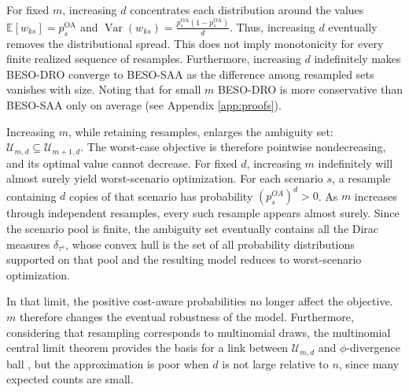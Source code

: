 \documentclass[mnsc,sglanonrev]{informs4}  %
\theoremstyle{remark}\newtheorem{remark}{Remark}
\begin{document}
For fixed $m$, increasing $d$ concentrates each distribution around the values 
$\mathbb E[w_{ks}]=p_s^{\mathrm{OA}}$ and
$\operatorname{Var}(w_{ks}) =\frac{p_s^{\mathrm{OA}}(1-p_s^{\mathrm{OA}})}{d}.$
Thus, increasing $d$ eventually removes the distributional spread. This does not imply monotonicity for every finite realized sequence of resamples. Furthermore, increasing $d$ indefinitely makes BESO-DRO converge to BESO-SAA as the difference among resampled sets vanishes with size. Noting that for small $m$ BESO-DRO is more conservative than BESO-SAA only on average (see Appendix \ref{app:proofs}).

Increasing $m$, while retaining resamples, enlarges the ambiguity set: $\mathcal U_{m,d}\subseteq\mathcal U_{m+1,d}.$
The worst-case objective is therefore pointwise nondecreasing, and its optimal value cannot decrease. 
For fixed $d$, increasing $m$ indefinitely will almost surely yield worst-scenario optimization. For each scenario $s$, a resample containing $d$ copies of that scenario has probability $(p_s^{OA})^d>0$. As $m$ increases through independent resamples, every such resample appears almost surely. Since the scenario pool is finite, the ambiguity set eventually contains all the Dirac measures $\delta_{\tau^s}$, whose convex hull is the set of all probability distributions supported on that pool and the resulting model reduces to worst-scenario optimization.

In that limit, the positive cost-aware probabilities no longer affect the objective. \(m\) therefore changes the eventual robustness of the model. Furthermore, considering that resampling corresponds to multinomial draws, the multinomial central limit theorem provides the basis for a link between $\mathcal U_{m,d}$ and $\phi$-divergence ball \cite{BTGN13}, but the approximation is poor when $d$ is not large relative to $n$, since many expected counts are small.

\end{document}

